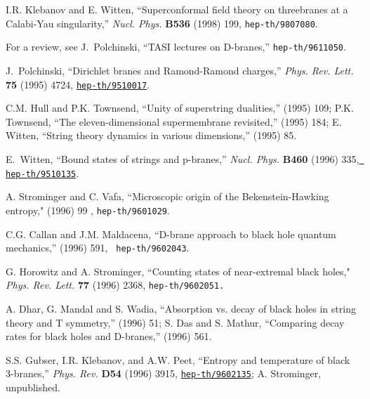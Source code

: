 \documentclass[12pt]{article}
\begin{document}
\begin{thebibliography}{99}
I.R. Klebanov and E. Witten,
``Superconformal field theory on threebranes 
at a Calabi-Yau singularity,'' {\em Nucl. Phys.} {\bf B536} (1998) 199,
{{\tt hep-th/9807080}}.

For a review, see J.~Polchinski, ``TASI lectures on D-branes,''
{\tt hep-th/9611050}.

J.~Polchinski, ``Dirichlet branes and Ramond-Ramond charges,'' {\em Phys. Rev.
  Lett.} {\bf 75} (1995) 4724,
  \href{http://xxx.lanl.gov/abs/hep-th/9510017}{{\tt hep-th/9510017}}.

C.M. Hull and P.K. Townsend, ``Unity of superstring dualities,''
 (1995) 109;
P.K. Townsend, ``The eleven-dimensional supermembrane
    revisited,'' (1995) 184;
E. Witten, ``String theory dynamics in various dimensions,''
 (1995) 85.

E.~Witten, ``Bound states of strings and p-branes,'' {\em Nucl. Phys.} {\bf
  B460} (1996) 335, \href{http://xxx.lanl.gov/abs/hep-th/9510135}{{\tt
  hep-th/9510135}}.


A. Strominger   and C. Vafa,
``Microscopic origin of the Bekenstein-Hawking \\ entropy,"
 (1996) 99 , {\tt hep-th/9601029}.

C.G. Callan and J.M. Maldacena, ``D-brane approach to black
hole quantum \\ mechanics,''  (1996) 591, {\tt
hep-th/9602043}.

 G. Horowitz  and A.  Strominger,
``Counting states of near-extremal black holes,"
   {\em Phys. Rev. Lett.}  {\bf 77} (1996) 2368,
{\tt hep-th/9602051.}

A. Dhar, G. Mandal and S. Wadia, ``Absorption vs. decay of black holes
in string theory and T symmetry,''  (1996) 51;
S. Das and S. Mathur, ``Comparing decay rates
    for black holes and D-branes,''  (1996) 561.


S.S. Gubser, I.R. Klebanov, and A.W. Peet, ``Entropy and temperature of
  black 3-branes,'' {\em Phys. Rev.} {\bf D54} (1996) 3915,
  \href{http://xxx.lanl.gov/abs/hep-th/9602135}{{\tt hep-th/9602135}};
A. Strominger, unpublished.


\end{thebibliography}
\end{document}
